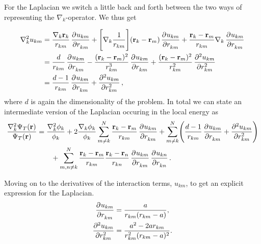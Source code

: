 \documentclass[
    a4paper, aps, twocolumn, floatfix, superscriptaddress, nofootinbib]{revtex4-1}
\newcommand{\vf}{\mathbf}
\newcommand{\1}{\mathds{1}}
\begin{document}
            For the Laplacian we switch a little back and forth between the two
            ways of representing the $\nabla_k$-operator. We thus get
            \begin{widetext}
                \begin{align}
                    \nabla_k^2 u_{km}
                    &=
                    \frac{\nabla_k \vf{r}_k}{r_{km}}\dpd[]{u_{km}}{r_{km}}
                    + \Biggl[
                        \nabla_k \frac{1}{r_{km}}
                    \Biggr]
                    (\vf{r}_k - \vf{r}_m)\dpd[]{u_{km}}{r_{km}}
                    + \frac{\vf{r}_k - \vf{r}_m}{r_{km}}
                    \nabla_k \dpd[]{u_{km}}{r_{km}} \\
                    &= \frac{d}{r_{km}}\dpd[]{u_{km}}{r_{km}}
                    - \frac{(\vf{r}_k - \vf{r}_m)^2}{r_{km}^3}
                    \dpd[]{u_{km}}{r_{km}}
                    + \frac{(\vf{r}_k - \vf{r}_m)^2}{r_{km}^2}
                    \dpd[2]{u_{km}}{r_{km}} \\
                    &=
                    \frac{d - 1}{r_{km}}\dpd[]{u_{km}}{r_{km}}
                    + \dpd[2]{u_{km}}{r_{km}},
                \end{align}
                where $d$ is again the dimensionality of the problem. In total
                we can state an intermediate version of the Laplacian occuring
                in the local energy as
                \begin{align}
                    \frac{\nabla_k^2\Psi_T(\vf{r})}{\Psi_T(\vf{r})}
                    &=
                    \frac{\nabla_k^2\phi_k}{\phi_k}
                    + 2\frac{\nabla_k\phi_k}{\phi_k}
                    \sum_{m \neq k}^N
                    \frac{\vf{r}_k - \vf{r}_m}{r_{km}}
                    \dpd[]{u_{km}}{r_{km}}
                    + \sum_{m\neq k}^N
                    \Biggl(
                        \frac{d - 1}{r_{km}}\dpd[]{u_{km}}{r_{km}}
                        + \dpd[2]{u_{km}}{r_{km}}
                    \Biggr)
                    \nonumber \\
                    &\qquad
                    +
                    \sum_{m, n \neq k}^N
                    \frac{\vf{r}_k - \vf{r}_m}{r_{km}}
                    \frac{\vf{r}_k - \vf{r}_n}{r_{kn}}
                    \dpd[]{u_{km}}{r_{km}}
                    \dpd[]{u_{kn}}{r_{kn}}.
                \end{align}
            \end{widetext}
            Moving on to the derivatives of the interaction terms, $u_{km}$, to
            get an explicit expression for the Laplacian.
            \begin{align}
                \dpd[]{u_{km}}{r_{km}}
                &=
                \frac{a}{r_{km}(r_{km} - a)},
                \\
                \dpd[2]{u_{km}}{r_{km}}
                &= \frac{a^2 - 2ar_{km}}{r_{km}^2(r_{km} - a)^2}.
            \end{align}
\end{document}
